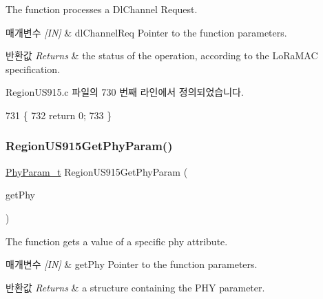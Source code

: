 The function processes a Dl\+Channel Request. 


\begin{DoxyParams}{매개변수}
{\em \mbox{[}\+I\+N\mbox{]}} & dl\+Channel\+Req Pointer to the function parameters.\\
\hline
\end{DoxyParams}

\begin{DoxyRetVals}{반환값}
{\em Returns} & the status of the operation, according to the Lo\+Ra\+M\+AC specification. \\
\hline
\end{DoxyRetVals}


Region\+U\+S915.\+c 파일의 730 번째 라인에서 정의되었습니다.


\begin{DoxyCode}
731 \{
732     \textcolor{keywordflow}{return} 0;
733 \}
\end{DoxyCode}
\mbox{\label{group___r_e_g_i_o_n_u_s915_ga644569c2f1367a399ff93a81f160a7d9}} 
\subsubsection{\texorpdfstring{Region\+U\+S915\+Get\+Phy\+Param()}{RegionUS915GetPhyParam()}}
{\footnotesize\ttfamily \mbox{\hyperlink{group___r_e_g_i_o_n_gaed159b26e5c4677236b6e8677019db30}{Phy\+Param\+\_\+t}} Region\+U\+S915\+Get\+Phy\+Param (\begin{DoxyParamCaption}\item[{\mbox{\hyperlink{group___r_e_g_i_o_n_gab471483fff904f4f89bbc03f7fc380ab}{Get\+Phy\+Params\+\_\+t}} $\ast$}]{get\+Phy }\end{DoxyParamCaption})}



The function gets a value of a specific phy attribute. 


\begin{DoxyParams}{매개변수}
{\em \mbox{[}\+I\+N\mbox{]}} & get\+Phy Pointer to the function parameters.\\
\hline
\end{DoxyParams}

\begin{DoxyRetVals}{반환값}
{\em Returns} & a structure containing the P\+HY parameter. \\
\hline
\end{DoxyRetVals}


